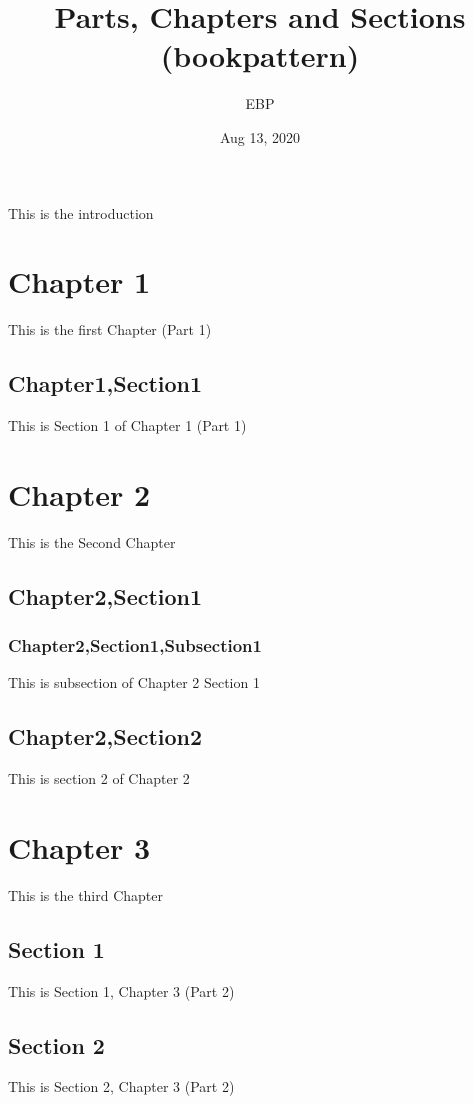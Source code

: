 \documentclass[letterpaper,10pt,english]{sphinxmanual}
\title{Parts, Chapters and Sections (bookpattern)}
\date{Aug 13, 2020}
\author{EBP}
\begin{document}
\pagestyle{empty}
\sphinxmaketitle
\pagestyle{plain}
\sphinxtableofcontents
\pagestyle{normal}
\label{\detokenize{intro::doc}}


This is the introduction


\chapter{Chapter 1}
\label{\detokenize{part1/chapter1:chapter-1}}\label{\detokenize{part1/chapter1::doc}}
This is the first Chapter (Part 1)


\section{Chapter1,Section1}
\label{\detokenize{part1/chapter1:chapter1-section1}}
This is Section 1 of Chapter 1 (Part 1)


\chapter{Chapter 2}
\label{\detokenize{part1/chapter2:chapter-2}}\label{\detokenize{part1/chapter2::doc}}
This is the Second Chapter


\section{Chapter2,Section1}
\label{\detokenize{part1/chapter2:chapter2-section1}}

\subsection{Chapter2,Section1,Subsection1}
\label{\detokenize{part1/chapter2:chapter2-section1-subsection1}}
This is subsection of Chapter 2 Section 1


\section{Chapter2,Section2}
\label{\detokenize{part1/chapter2:chapter2-section2}}
This is section 2 of Chapter 2


\chapter{Chapter 3}
\label{\detokenize{part2/chapter3:chapter-3}}\label{\detokenize{part2/chapter3::doc}}
This is the third Chapter


\section{Section 1}
\label{\detokenize{part2/chapter3-section1:section-1}}\label{\detokenize{part2/chapter3-section1::doc}}
This is Section 1, Chapter 3 (Part 2)


\section{Section 2}
\label{\detokenize{part2/chapter3-section2:section-2}}\label{\detokenize{part2/chapter3-section2::doc}}
This is Section 2, Chapter 3 (Part 2)







\renewcommand{\indexname}{Index}
\printindex
\end{document}
